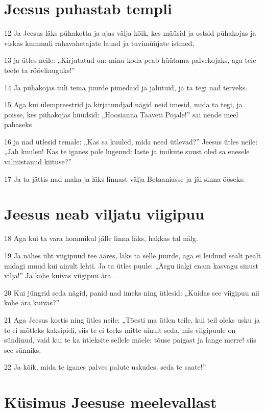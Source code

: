 \section*{Jeesus puhastab templi}

\par 12 Ja Jeesus läks pühakotta ja ajas välja kõik, kes müüsid ja ostsid pühakojas ja viskas kummuli rahavahetajate lauad ja tuvimüüjate istmed,
\par 13 ja ütles neile: „Kirjutatud on: minu koda peab hüütama palvekojaks, aga teie teete ta röövliauguks!”
\par 14 Ja pühakojas tuli tema juurde pimedaid ja jalutuid, ja ta tegi nad terveks.
\par 15 Aga kui ülempreestrid ja kirjatundjad nägid neid imesid, mida ta tegi, ja poisse, kes pühakojas hüüdsid: „Hoosianna Taaveti Pojale!” sai nende meel pahaseks
\par 16 ja nad ütlesid temale: „Kas sa kuuled, mida need ütlevad?” Jeesus ütles neile: „Jah kuulen! Kas te iganes pole lugenud: laste ja imikute suust oled sa enesele valmistanud kiituse?”
\par 17 Ja ta jättis nad maha ja läks linnast välja Betaaniasse ja jäi sinna ööseks.

\section*{Jeesus neab viljatu viigipuu}

\par 18 Aga kui ta vara hommikul jälle linna läks, hakkas tal nälg.
\par 19 Ja nähes üht viigipuud tee ääres, läks ta selle juurde, aga ei leidnud sealt pealt midagi muud kui ainult lehti. Ja ta ütles puule: „Ärgu iialgi enam kasvagu sinust vilja!” Ja kohe kuivas viigipuu ära.
\par 20 Kui jüngrid seda nägid, panid nad imeks ning ütlesid: „Kuidas see viigipuu nii kohe ära kuivas?”
\par 21 Aga Jeesus kostis ning ütles neile: „Tõesti ma ütlen teile, kui teil oleks usku ja te ei mõtleks kaksipidi, siis te ei teeks mitte ainult seda, mis viigipuule on sündinud, vaid kui te ka ütleksite sellele mäele: tõuse paigast ja lange merre! siis see sünniks.
\par 22 Ja kõik, mida te iganes palves palute uskudes, seda te saate!”

\section*{Küsimus Jeesuse meelevallast}

